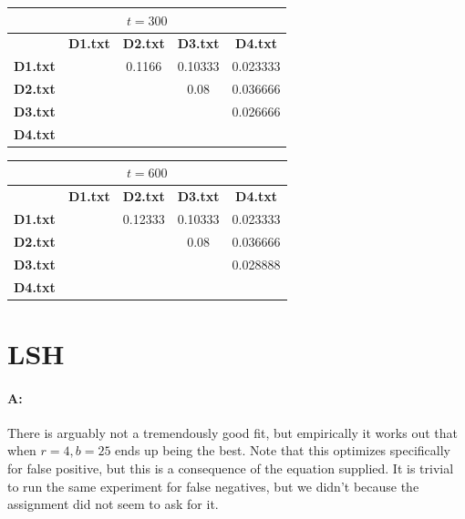 \documentclass[11pt]{article}
\begin{document}
\begin{center}

\begin{tabular}{| c || c | c | c | c |}
\hline
\multicolumn{5}{|c|}{$t = 300$} \\
\hline
& \textbf{D1.txt} & \textbf{D2.txt}  & \textbf{D3.txt}  & \textbf{D4.txt} \\
\hline
\hline
\textbf{D1.txt} &  & 0.1166 & 0.10333 & 0.023333 \\
\hline
\textbf{D2.txt} &  & & 0.08 & 0.036666 \\
\hline
\textbf{D3.txt} &  &  &  & 0.026666 \\
\hline
\textbf{D4.txt} &  &  &  &  \\
\hline
\end{tabular}

\end{center}

\begin{center}

\begin{tabular}{| c || c | c | c | c |}
\hline
\multicolumn{5}{|c|}{$t = 600$} \\
\hline
& \textbf{D1.txt} & \textbf{D2.txt}  & \textbf{D3.txt}  & \textbf{D4.txt} \\
\hline
\hline
\textbf{D1.txt} &  & 0.12333 & 0.10333 & 0.023333 \\
\hline
\textbf{D2.txt} &  & & 0.08 & 0.036666 \\
\hline
\textbf{D3.txt} &  &  &  & 0.028888 \\
\hline
\textbf{D4.txt} &  &  &  &  \\
\hline
\end{tabular}

\end{center}



\section{LSH}

\paragraph*{A:} There is arguably not a tremendously good fit, but empirically it works out that when $r = 4, b = 25$ ends up being the best. Note that this optimizes specifically for false positive, but this is a consequence of the equation supplied. It is trivial to run the same experiment for false negatives, but we didn't because the assignment did not seem to ask for it.
\end{document}
